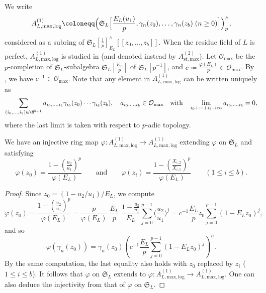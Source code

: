 We write 
\[
A^{(1)}_{L, \mathrm{max, log}}\coloneqq  \Bigl(\mathfrak{S}_L\Bigl[\frac{E_L(u_1)}{p}, \gamma_n (z_0),\ldots,\gamma_n (z_b) \;(n\geq 0)\Bigr]\Bigr)^{\wedge}_p,
\]
considered as a subring of $\mathfrak{S}_L[{\frac{1}{p}}]_{E_L}^\wedge [\![ z_0,\ldots,z_b]\!]$. 
When the residue field of $L$ is perfect, $A^{(1)}_{L, \mathrm{max, log}}$ is studied in \cite[\S2.3]{du-liu-prismaticphiGhatmodule} (and denoted instead by $A^{(2)}_{\mathrm{st}, \mathrm{max}}$). Let $\mathcal{O}_{\mathrm{max}}$ be the $p$-completion of $\mathfrak{S}_L$-subalgebra $\mathfrak{S}_L[\frac{E_L}{p}]$ of $\mathfrak{S}_L[p^{-1}]$, and $c \coloneqq \frac{\varphi(E_L)}{p} \in \mathcal{O}_{\mathrm{max}}$. By \cite[Lem.~2.2.2]{du-liu-prismaticphiGhatmodule}, we have $c^{-1} \in \mathcal{O}_{\mathrm{max}}$. Note that any element in $A^{(1)}_{L, \mathrm{max, log}}$ can be written uniquely as 
\[
\sum_{(i_0, \ldots, i_b)\in \N^{b+1}} a_{i_0, \ldots, i_b} \gamma_{i_0}(z_0)\cdots\gamma_{i_b}(z_b),
\quad a_{i_0, \ldots, i_b} \in \mathcal{O}_{\mathrm{max}} \quad\text{with}\quad \lim_{i_0+\cdots+i_b \to \infty}a_{i_0, \ldots, i_b}=0,
\]
where the last limit is taken with respect to $p$-adic topology.

\begin{lem} \label{lem:CDVR-A(1)maxlog-Frob}
We have an injective ring map $\varphi\colon A^{(1)}_{L, \mathrm{max, log}} \rightarrow A^{(1)}_{L, \mathrm{max, log}}$ extending $\varphi$ on $\mathfrak{S}_L$ and satisfying
\[
\varphi(z_0) = \frac{1-(\frac{u_2}{u_1})^p}{\varphi(E_L)} \qquad\text{and}\qquad \varphi(z_i) = \frac{1-(\frac{X_{i, 2}}{X_{i, 1}})^p}{\varphi(E_L)} \qquad(1 \leq i \leq b).
\]
\end{lem}

\begin{proof}
Since $z_0=(1-u_2/u_1)/E_L$, we compute
\[
\varphi(z_0)=\frac{1-(\frac{u_2}{u_1})^p}{\varphi(E_L)}=\frac{p}{\varphi(E_L)}\; \frac{E_L}{p}\; \frac{1-\frac{u_2}{u_1}}{E_L}\sum_{j=0}^{p-1}\biggl(\frac{u_2}{u_1}\biggr)^j=c^{-1}\frac{E_L}{p}z_0\sum_{j=0}^{p-1} (1-E_L z_0)^j,
\]
and so
\[
\varphi(\gamma_n(z_0)) = \gamma_n(z_0)(c^{-1}\frac{E_L}{p}\sum_{j=0}^{p-1} (1-E_L z_0)^j)^n.
\]
By the same computation, the last equality also holds with $z_0$ replaced by $z_i$ ($1\leq i\leq b$). It follows that $\varphi$ on $\mathfrak{S}_L$ extends to $\varphi\colon A^{(1)}_{L, \mathrm{max, log}}\rightarrow A^{(1)}_{L, \mathrm{max, log}}$. One can also deduce the injectivity from that of $\varphi$ on $\mathfrak{S}_L$.
\end{proof}

